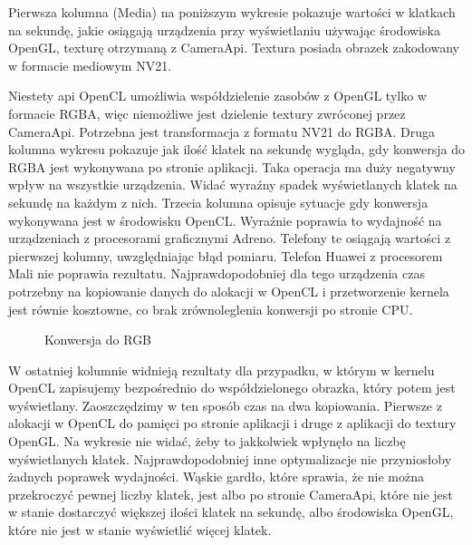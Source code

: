 Pierwsza kolumna (Media) na poniższym wykresie pokazuje wartości w klatkach na sekundę, jakie osiągają urządzenia przy wyświetlaniu używając środowiska OpenGL, texturę otrzymaną z CameraApi. Textura posiada obrazek zakodowany w formacie mediowym NV21.

Niestety api OpenCL umożliwia współdzielenie zasobów z OpenGL tylko w formacie RGBA, więc niemożliwe jest dzielenie textury zwróconej przez CameraApi. Potrzebna jest transformacja z formatu NV21 do RGBA. Druga kolumna wykresu pokazuje jak ilość klatek na sekundę wygląda, gdy konwersja do RGBA jest wykonywana po stronie aplikacji. Taka operacja ma duży negatywny wpływ na wszystkie urządzenia. Widać wyraźny spadek wyświetlanych klatek na sekundę na każdym z nich. 
Trzecia kolumna opisuje sytuacje gdy konwersja wykonywana jest w środowisku OpenCL. Wyraźnie poprawia to wydajność na urządzeniach z procesorami graficznymi Adreno. Telefony te osiągają wartości z pierwszej kolumny, uwzględniając błąd pomiaru. Telefon Huawei z procesorem Mali nie poprawia rezultatu. Najprawdopodobniej dla tego urządzenia czas potrzebny na kopiowanie danych do alokacji w OpenCL i przetworzenie kernela jest równie kosztowne, co brak zrównoleglenia konwersji po stronie CPU. 
\begin{figure}[H]
\caption{Konwersja do RGB}
\end{figure}

W ostatniej kolumnie widnieją rezultaty dla przypadku, w którym w kernelu OpenCL zapisujemy bezpośrednio do współdzielonego obrazka, który potem jest wyświetlany. Zaoszczędzimy w ten sposób czas na dwa kopiowania. Pierwsze z alokacji w OpenCL do pamięci po stronie aplikacji i druge z aplikacji do textury OpenGL. Na wykresie nie widać, żeby to jakkolwiek wpłynęło na liczbę wyświetlanych klatek. Najprawdopodobniej inne optymalizacje nie przyniosłoby żadnych poprawek wydajności. Wąskie gardło, które sprawia, że nie można przekroczyć pewnej liczby klatek, jest albo po stronie CameraApi, które nie jest w stanie dostarczyć większej ilości klatek na sekundę, albo środowiska OpenGL, które nie jest w stanie wyświetlić więcej klatek.

